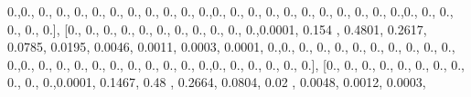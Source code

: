 \documentclass[
]{book}
\newenvironment{Shaded}{\begin{snugshade}}{\end{snugshade}}
\newcommand{\FloatTok}[1]{\textcolor[rgb]{0.00,0.00,0.81}{#1}}
\newcommand{\NormalTok}[1]{#1}
\begin{document}
\begin{Shaded}
\begin{Highlighting}[]
\FloatTok{0.}\NormalTok{,}\FloatTok{0.}\NormalTok{, }\FloatTok{0.}\NormalTok{, }\FloatTok{0.}\NormalTok{, }\FloatTok{0.}\NormalTok{, }\FloatTok{0.}\NormalTok{, }\FloatTok{0.}\NormalTok{, }\FloatTok{0.}\NormalTok{, }\FloatTok{0.}\NormalTok{, }\FloatTok{0.}\NormalTok{, }\FloatTok{0.}\NormalTok{, }\FloatTok{0.}\NormalTok{,}\FloatTok{0.}\NormalTok{, }\FloatTok{0.}\NormalTok{, }\FloatTok{0.}\NormalTok{, }\FloatTok{0.}\NormalTok{, }\FloatTok{0.}\NormalTok{, }\FloatTok{0.}\NormalTok{, }\FloatTok{0.}\NormalTok{, }\FloatTok{0.}\NormalTok{,}
\FloatTok{0.}\NormalTok{, }\FloatTok{0.}\NormalTok{, }\FloatTok{0.}\NormalTok{,}\FloatTok{0.}\NormalTok{, }\FloatTok{0.}\NormalTok{, }\FloatTok{0.}\NormalTok{, }\FloatTok{0.}\NormalTok{, }\FloatTok{0.}\NormalTok{, }\FloatTok{0.}\NormalTok{], [}\FloatTok{0.}\NormalTok{, }\FloatTok{0.}\NormalTok{, }\FloatTok{0.}\NormalTok{, }\FloatTok{0.}\NormalTok{, }\FloatTok{0.}\NormalTok{, }\FloatTok{0.}\NormalTok{, }\FloatTok{0.}\NormalTok{, }\FloatTok{0.}\NormalTok{, }\FloatTok{0.}\NormalTok{, }\FloatTok{0.}\NormalTok{,}
\FloatTok{0.}\NormalTok{,}\FloatTok{0.0001}\NormalTok{, }\FloatTok{0.154}\NormalTok{ , }\FloatTok{0.4801}\NormalTok{, }\FloatTok{0.2617}\NormalTok{, }\FloatTok{0.0785}\NormalTok{, }\FloatTok{0.0195}\NormalTok{, }\FloatTok{0.0046}\NormalTok{, }\FloatTok{0.0011}\NormalTok{, }\FloatTok{0.0003}\NormalTok{,}
\FloatTok{0.0001}\NormalTok{, }\FloatTok{0.}\NormalTok{,}\FloatTok{0.}\NormalTok{, }\FloatTok{0.}\NormalTok{, }\FloatTok{0.}\NormalTok{, }\FloatTok{0.}\NormalTok{, }\FloatTok{0.}\NormalTok{, }\FloatTok{0.}\NormalTok{, }\FloatTok{0.}\NormalTok{, }\FloatTok{0.}\NormalTok{, }\FloatTok{0.}\NormalTok{, }\FloatTok{0.}\NormalTok{, }\FloatTok{0.}\NormalTok{,}\FloatTok{0.}\NormalTok{, }\FloatTok{0.}\NormalTok{, }\FloatTok{0.}\NormalTok{, }\FloatTok{0.}\NormalTok{, }\FloatTok{0.}\NormalTok{, }\FloatTok{0.}\NormalTok{,}
\FloatTok{0.}\NormalTok{, }\FloatTok{0.}\NormalTok{, }\FloatTok{0.}\NormalTok{, }\FloatTok{0.}\NormalTok{, }\FloatTok{0.}\NormalTok{,}\FloatTok{0.}\NormalTok{, }\FloatTok{0.}\NormalTok{, }\FloatTok{0.}\NormalTok{, }\FloatTok{0.}\NormalTok{, }\FloatTok{0.}\NormalTok{, }\FloatTok{0.}\NormalTok{], [}\FloatTok{0.}\NormalTok{, }\FloatTok{0.}\NormalTok{, }\FloatTok{0.}\NormalTok{, }\FloatTok{0.}\NormalTok{, }\FloatTok{0.}\NormalTok{, }\FloatTok{0.}\NormalTok{, }\FloatTok{0.}\NormalTok{, }\FloatTok{0.}\NormalTok{, }\FloatTok{0.}\NormalTok{,}
\FloatTok{0.}\NormalTok{, }\FloatTok{0.}\NormalTok{,}\FloatTok{0.0001}\NormalTok{, }\FloatTok{0.1467}\NormalTok{, }\FloatTok{0.48}\NormalTok{  , }\FloatTok{0.2664}\NormalTok{, }\FloatTok{0.0804}\NormalTok{, }\FloatTok{0.02}\NormalTok{  , }\FloatTok{0.0048}\NormalTok{, }\FloatTok{0.0012}\NormalTok{, }\FloatTok{0.0003}\NormalTok{,}

\end{Highlighting}
\end{Shaded}
\end{document}
